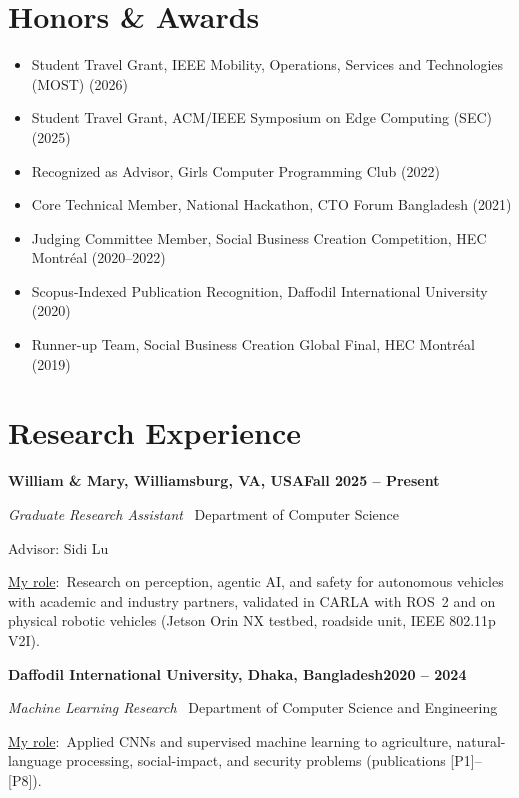 \documentclass[11pt,letterpaper]{article}
\newenvironment{numbered}[1][3.1em]
  {\begin{itemize}[leftmargin=#1, labelwidth=\dimexpr#1-0.5em\relax,
                   labelsep=0.5em, align=left, itemsep=3pt, topsep=2pt]}
  {\end{itemize}}
\newcommand{\org}[2]{\par\textbf{#1}\hfill\textbf{#2}\par\nobreak\interlinepenalty=10000}
\newcommand{\myrole}{\underline{My role}:}
\newcommand{\entrygap}{\par\vspace{6pt}}
\begin{document}
\section{Honors \& Awards}
\begin{numbered}
  \item[{[A7]}] Student Travel Grant, IEEE Mobility, Operations, Services and Technologies (MOST) (2026)
  \item[{[A6]}] Student Travel Grant, ACM/IEEE Symposium on Edge Computing (SEC) (2025)
  \item[{[A5]}] Recognized as Advisor, Girls Computer Programming Club (2022)
  \item[{[A4]}] Core Technical Member, National Hackathon, CTO Forum Bangladesh (2021)
  \item[{[A3]}] Judging Committee Member, Social Business Creation Competition, HEC Montr\'eal (2020--2022)
  \item[{[A2]}] Scopus-Indexed Publication Recognition, Daffodil International University (2020)
  \item[{[A1]}] Runner-up Team, Social Business Creation Global Final, HEC Montr\'eal (2019)
\end{numbered}

\section{Research Experience}
\org{William \& Mary, Williamsburg, VA, USA}{Fall 2025 -- Present}
\textit{Graduate Research Assistant} \textbar\ Department of Computer Science\par\nobreak
Advisor: Sidi Lu\par\nobreak
\myrole\ Research on perception, agentic AI, and safety for autonomous vehicles
with academic and industry partners, validated in CARLA with ROS~2 and on
physical robotic vehicles (Jetson Orin NX testbed, roadside unit, IEEE 802.11p V2I).
\entrygap
\org{Daffodil International University, Dhaka, Bangladesh}{2020 -- 2024}
\textit{Machine Learning Research} \textbar\ Department of Computer Science and Engineering\par\nobreak
\myrole\ Applied CNNs and supervised machine learning to agriculture,
natural-language processing, social-impact, and security problems
(publications [P1]--[P8]).

\end{document}

